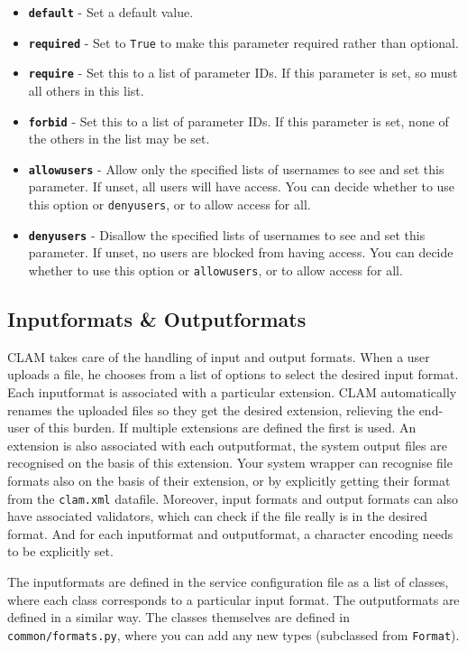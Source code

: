\documentclass[a4paper,12pt]{report}
\begin{document}
\begin{itemize}
\item \textbf{\texttt{default}} - Set a default value.
\item \textbf{\texttt{required}} - Set to \texttt{True} to make this parameter required rather than optional.
\item \textbf{\texttt{require}} - Set this to a list of parameter IDs. If this parameter is set, so must all others in this list.
\item \textbf{\texttt{forbid}} - Set this to a list of parameter IDs. If this parameter is set, none of the others in the list may be set.
\item \textbf{\texttt{allowusers}} - Allow only the specified lists of usernames to see and set this parameter. If unset, all users will have access. You can decide whether to use this option or \texttt{denyusers}, or to allow access for all.
\item \textbf{\texttt{denyusers}} - Disallow the specified lists of usernames to see and set this parameter. If unset, no users are blocked from having access. You can decide whether to use this option or \texttt{allowusers}, or to allow access for all.
\end{itemize}


\subsection{Inputformats \& Outputformats}
\label{sec:formats}

CLAM takes care of the handling of input and output formats. When a user uploads a file, he chooses from a list of options to select the desired input format. Each inputformat is associated with a particular extension. CLAM automatically renames the uploaded files so they get the desired extension, relieving the end-user of this burden. If multiple extensions are defined the first is used. An extension is also associated with each outputformat, the system output files are recognised on the basis of this extension. Your system wrapper can recognise file formats also on the basis of their extension, or by explicitly getting their format from the \texttt{clam.xml} datafile. Moreover, input formats and output formats can also have associated validators, which can check if the file really is in the desired format. And for each inputformat and outputformat, a character encoding needs to be explicitly set.

The inputformats are defined in the service configuration file as a list of classes, where each class corresponds to a particular input format. The outputformats are defined in a similar way. The classes themselves are defined in \texttt{common/formats.py}, where you can add any new types (subclassed from \texttt{Format}).
\end{document}
